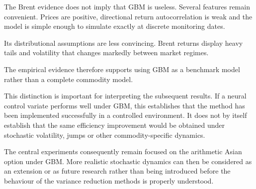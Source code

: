 The Brent evidence does not imply that GBM is useless. Several features remain convenient. Prices are positive, directional return autocorrelation is weak and the model is simple enough to simulate exactly at discrete monitoring dates.

Its distributional assumptions are less convincing. Brent returns display heavy tails and volatility that changes markedly between market regimes.

The empirical evidence therefore supports using GBM as a benchmark model rather than a complete commodity model.

This distinction is important for interpreting the subsequent results. If a neural control variate performs well under GBM, this establishes that the method has been implemented successfully in a controlled environment. It does not by itself establish that the same efficiency improvement would be obtained under stochastic volatility, jumps or other commodity-specific dynamics.

The central experiments consequently remain focused on the arithmetic Asian option under GBM. More realistic stochastic dynamics can then be considered as an extension or as future research rather than being introduced before the behaviour of the variance reduction methods is properly understood.
